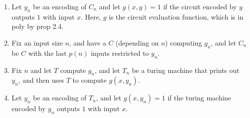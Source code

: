 \documentclass{article}
\begin{document}
\proof \hspace{0.1cm} \begin{enumerate}
    \item[$(1) \Rightarrow (2)$] Let $y_{n}$ be an encoding of $C_{n}$ and let $g(x,y)=1$ if the circuit encoded by $y$ outputs $1$ with input $x$. Here, $g$ is the circuit evaluation function, which is in poly by prop 2.4.
    \item[$(2) \Rightarrow (1)$] Fix an input size $n$, and have a $C$ (depending on $n$) computing $g_{n}$, and let $C_{n}$ be $C$ with the last $p(n)$ inputs restricted to $y_{n}$.
    \item[$(2) \Rightarrow (3)$] Fix $n$ and let $T$ compute $g_{n}$, and let $T_{n}$ be a turing machine that prints out $y_{n}$, and then uses $T$ to compute $g(x,y_{n})$.
    \item[$(3) \Rightarrow (2)$] Let $y_{n}$ be an encoding of $T_{n}$, and let $g(x,y_{n})=1$ if the turing machine encoded by $y_{n}$ outputs $1$ with input $x$.
\end{enumerate}
\endproof 
\end{document}
